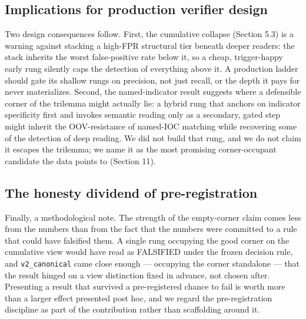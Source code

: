 \documentclass[sigconf,anonymous,review]{acmart}
\begin{document}
\subsection{Implications for production verifier design}
Two design consequences follow. First, the cumulative collapse (Section 5.3) is a warning against stacking a high-FPR structural tier beneath deeper readers: the stack inherits the worst false-positive rate below it, so a cheap, trigger-happy early rung silently caps the detection of everything above it. A production ladder should gate its shallow rungs on precision, not just recall, or the depth it pays for never materializes. Second, the named-indicator result suggests where a defensible corner of the trilemma might actually lie: a hybrid rung that anchors on indicator specificity first and invokes semantic reading only as a secondary, gated step might inherit the OOV-resistance of named-IOC matching while recovering some of the detection of deep reading. We did not build that rung, and we do not claim it escapes the trilemma; we name it as the most promising corner-occupant candidate the data points to (Section 11).


\subsection{The honesty dividend of pre-registration}
Finally, a methodological note. The strength of the empty-corner claim comes less from the numbers than from the fact that the numbers were committed to a rule that could have falsified them. A single rung occupying the good corner on the cumulative view would have read as FALSIFIED under the frozen decision rule, and \texttt{v2\_canonical} came close enough --- occupying the corner standalone --- that the result hinged on a view distinction fixed in advance, not chosen after. Presenting a result that survived a pre-registered chance to fail is worth more than a larger effect presented post hoc, and we regard the pre-registration discipline as part of the contribution rather than scaffolding around it.
\end{document}
